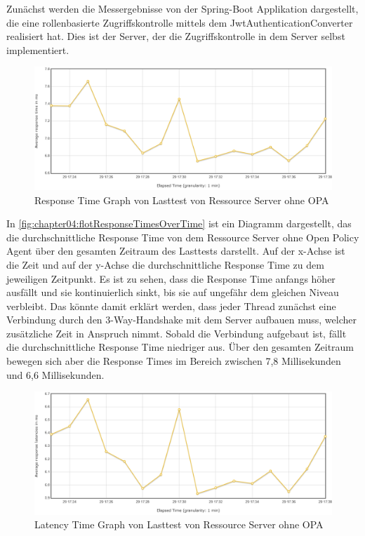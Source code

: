 Zunächst werden die Messergebnisse von der Spring-Boot Applikation dargestellt, die eine rollenbasierte Zugriffskontrolle mittels dem JwtAuthenticationConverter realisiert hat. Dies ist der Server, der die Zugriffskontrolle in dem Server selbst implementiert. 

\begin{figure}[H]
  \centering
  \includegraphics[width=1.0\textwidth]{gfx/flotResponseTimesOverTime.png}
  \caption{Response Time Graph von Lasttest von Ressource Server ohne OPA}
  \label{fig:chapter04:flotResponseTimesOverTime}
\end{figure}

In \autoref{fig:chapter04:flotResponseTimesOverTime} ist ein Diagramm dargestellt, das die durchschnittliche Response Time von dem Ressource Server ohne Open Policy Agent über den gesamten Zeitraum des Lasttests darstellt. Auf der x-Achse ist die Zeit und auf der y-Achse die durchschnittliche Response Time zu dem jeweiligen Zeitpunkt. Es ist zu sehen, dass die Response Time anfangs höher ausfällt und sie kontinuierlich sinkt, bis sie auf ungefähr dem gleichen Niveau verbleibt. Das könnte damit erklärt werden, dass jeder Thread zunächst eine Verbindung durch den 3-Way-Handshake mit dem Server aufbauen muss, welcher zusätzliche Zeit in Anspruch nimmt. Sobald die Verbindung aufgebaut ist, fällt die durchschnittliche Response Time niedriger aus. Über den gesamten Zeitraum bewegen sich aber die Response Times im Bereich zwischen 7,8 Millisekunden und 6,6 Millisekunden. 

\begin{figure}[H]
  \centering
  \includegraphics[width=1.0\textwidth]{gfx/flotLatenciesOverTime.png}
  \caption{Latency Time Graph von Lasttest von Ressource Server ohne OPA}
  \label{fig:chapter04:flotLatenciesOverTime}
\end{figure}

